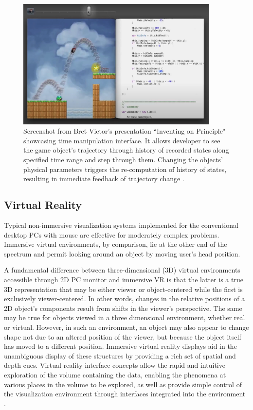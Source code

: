 \begin{figure}[!ht]
	\centering
	\includegraphics[width=0.9\textwidth]{figures/victor-time-manip.jpg}
	\caption{Screenshot from Bret Victor's presentation ``Inventing on Principle" showcasing time manipulation interface. It allows developer to see the game object's trajectory through history of recorded states along specified time range and step through them. Changing the objects' physical parameters triggers the re-computation of history of states, resulting in immediate feedback of trajectory change \citep{victorInventingOnPrinciple2018}.}
	\label{fig:victor-time-manip}
\end{figure}

\subsection{Virtual Reality}\label{sec:vrar}
Typical non-immersive visualization systems implemented for the conventional desktop PCs with mouse are effective for moderately complex problems. Immersive virtual environments, by comparison, lie at the other end of the spectrum and permit looking around an object by moving user's head position.

A fundamental difference between three-dimensional (3D) virtual environments accessible through 2D PC monitor and immersive VR is that the latter is a true 3D representation that may be either viewer or object-centered while the first is exclusively viewer-centered. In other words, changes in the relative positions of a 2D object's components result from shifts in the viewer's perspective. The same may be true for objects viewed in a three dimensional environment, whether real or virtual. However, in such an environment, an object may also appear to change shape not due to an altered position of the viewer, but because the object itself has moved to a different position. Immersive virtual reality displays aid in the unambiguous display of these structures by providing a rich set of spatial and depth cues. Virtual reality interface concepts allow the rapid and intuitive exploration of the volume containing the data, enabling the phenomena at various places in the volume to be explored, as well as provide simple control of the visualization environment through interfaces integrated into the environment \citep{brysonVirtualRealityScientific}.

